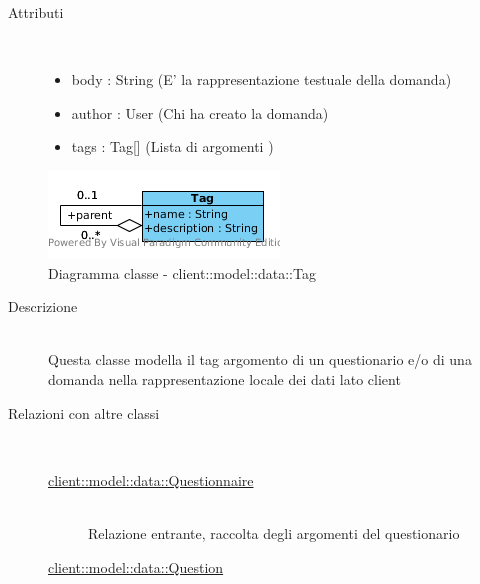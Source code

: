 \begin{description}
\item[Attributi] \hfill \\
 \vspace{-7mm}
\begin{itemize}
\item body : String (E' la rappresentazione testuale della domanda)
\item author : User  (Chi ha creato la domanda)
\item tags  : Tag[] (Lista di argomenti  )
\end{itemize}

\end{description}

\vspace{0.5cm}
\hypertarget{client::model::data::Tag}{}
\begin{center}
			\begin{figure}[H]
				\centering \includegraphics[scale=4, max width=\textwidth, max height=\myheight]{../img/diagrammiClassi/client/model/data/Tag.png}
				\caption{Diagramma classe - client::model::data::Tag}
			\end{figure}
		\end{center}\begin{description}
\item[Descrizione] \hfill \\
 Questa classe modella il tag argomento di un questionario e/o di una domanda nella rappresentazione locale dei dati lato client
\item[Relazioni con altre classi] \hfill \\
 \vspace{-7mm}
\begin{description}
\item[\hyperlink{client::model::data::Questionnaire}{client::model::data::Questionnaire}] \hfill \\
 Relazione entrante, raccolta degli argomenti del questionario
\item[\hyperlink{client::model::data::Question}{client::model::data::Question}] \hfill \\

\end{description}
\end{description}
